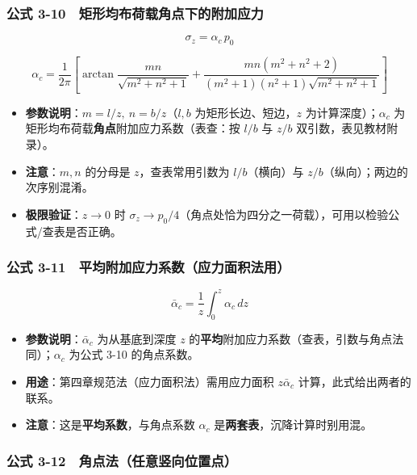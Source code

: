 \documentclass[
]{article}
\providecommand{\tightlist}{%
  \setlength{\itemsep}{0pt}\setlength{\parskip}{0pt}}
\begin{document}
\subsubsection{公式
3-10　矩形均布荷载角点下的附加应力}\label{ux516cux5f0f-3-10-ux77e9ux5f62ux5747ux5e03ux8377ux8f7dux89d2ux70b9ux4e0bux7684ux9644ux52a0ux5e94ux529b}

\[\sigma_z=\alpha_c\, p_0\]

\[\alpha_c=\frac{1}{2\pi}\left[\arctan\frac{mn}{\sqrt{m^2+n^2+1}}+\frac{mn\left(m^2+n^2+2\right)}{\left(m^2+1\right)\left(n^2+1\right)\sqrt{m^2+n^2+1}}\right]\]

\begin{itemize}
\tightlist
\item
  \textbf{参数说明}：\(m=l/z,\ n=b/z\)（\(l,b\) 为矩形长边、短边，\(z\)
  为计算深度）；\(\alpha_c\)
  为矩形均布荷载\textbf{角点}附加应力系数（表查：按 \(l/b\) 与 \(z/b\)
  双引数，表见教材附录）。
\item
  \textbf{注意}：\(m,n\) 的分母是 \(z\)，查表常用引数为
  \(l/b\)（横向）与 \(z/b\)（纵向）；两边的次序别混淆。
\item
  \textbf{极限验证}：\(z\to0\) 时
  \(\sigma_z\to p_0/4\)（角点处恰为四分之一荷载），可用以检验公式/查表是否正确。
\end{itemize}

\subsubsection{公式
3-11　平均附加应力系数（应力面积法用）}\label{ux516cux5f0f-3-11-ux5e73ux5747ux9644ux52a0ux5e94ux529bux7cfbux6570ux5e94ux529bux9762ux79efux6cd5ux7528}

\[\bar\alpha_c=\frac{1}{z}\int_0^z\alpha_c\,dz\]

\begin{itemize}
\tightlist
\item
  \textbf{参数说明}：\(\bar\alpha_c\) 为从基底到深度 \(z\)
  的\textbf{平均}附加应力系数（查表，引数与角点法同）；\(\alpha_c\)
  为公式 3-10 的角点系数。
\item
  \textbf{用途}：第四章规范法（应力面积法）需用应力面积
  \(z\bar\alpha_c\) 计算，此式给出两者的联系。
\item
  \textbf{注意}：这是\textbf{平均系数}，与角点系数 \(\alpha_c\)
  是\textbf{两套表}，沉降计算时别用混。
\end{itemize}

\subsubsection{公式
3-12　角点法（任意竖向位置点）}\label{ux516cux5f0f-3-12-ux89d2ux70b9ux6cd5ux4efbux610fux7ad6ux5411ux4f4dux7f6eux70b9}
\end{document}
